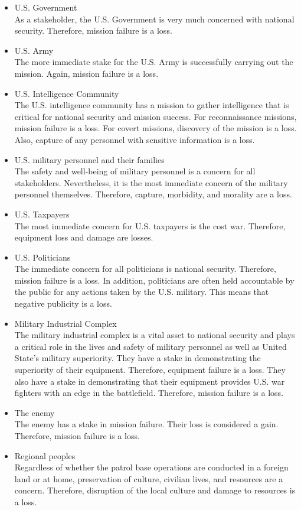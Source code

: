 \documentclass[../../main/main.tex]{subfiles}
\begin{document}
\begin{itemize}
\item U.S. Government\\
As a stakeholder, the U.S. Government is very much concerned with national security. Therefore, mission failure is a loss.
\item U.S. Army\\
The more immediate stake for the U.S. Army is successfully carrying out the mission.  Again, mission failure is a loss.
\item U.S. Intelligence Community\\
The U.S. intelligence community has a mission to gather intelligence that is critical for national security and mission success.  For reconnaissance missions, mission failure is a loss. For covert missions, discovery of the mission is a loss.  Also, capture of any personnel with sensitive information is a loss. 
\item U.S. military personnel and their families\\
The safety and well-being of military personnel is a concern for all stakeholders.  Nevertheless, it is the most immediate concern of the military personnel themselves.  Therefore, capture, morbidity, and morality are a loss.
\item U.S. Taxpayers\\
The most immediate concern for U.S. taxpayers is the cost war.  Therefore, equipment loss and damage are losses.  
\item U.S. Politicians\\
The immediate concern for all politicians is national security.  Therefore, mission failure is a loss.   In addition, politicians are often held accountable by the public for any actions taken by the U.S. military.  This means that negative publicity is a loss.  
\item Military Industrial Complex\\
The military industrial complex is a vital asset to national security and plays a critical role in the lives and safety of military personnel as well as United State's military superiority.  They have a stake in demonstrating the superiority of their equipment.  Therefore, equipment failure is a loss.  They also have a stake in demonstrating that their equipment provides U.S. war fighters with an edge in the battlefield.  Therefore, mission failure is a loss.
\item The enemy\\
The enemy has a stake in mission failure.  Their loss is considered a gain.  Therefore, mission failure is a loss.  
\item Regional peoples\\
Regardless of whether the patrol base operations are conducted in a foreign land or at home, preservation of culture, civilian lives, and resources are a concern.  Therefore, disruption of the local culture and damage to resources is a loss. 
\end{itemize}
\end{document}

